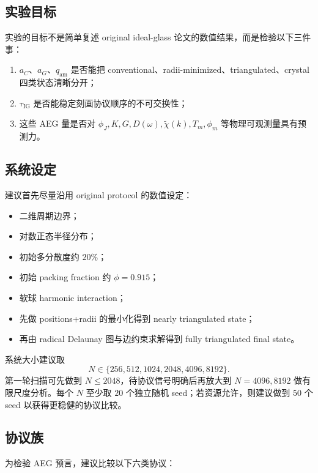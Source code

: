\documentclass[12pt]{ctexart}
\newcommand{\IG}{\mathrm{IG}}
\begin{document}
\subsection{实验目标}

实验的目标不是简单复述 original ideal-glass 论文的数值结果，而是检验以下三件事：
\begin{enumerate}
    \item $a_C$、$a_G$、$q_{\mathrm{am}}$ 是否能把 conventional、radii-minimized、triangulated、crystal 四类状态清晰分开；
    \item $\tau_{\IG}$ 是否能稳定刻画协议顺序的不可交换性；
    \item 这些 AEG 量是否对 $\phi_J, K, G, D(\omega), \tilde\chi(k), T_m, \phi_m$ 等物理可观测量具有预测力。
\end{enumerate}

\subsection{系统设定}

建议首先尽量沿用 original protocol 的数值设定：
\begin{itemize}
    \item 二维周期边界；
    \item 对数正态半径分布；
    \item 初始多分散度约 $20\%$；
    \item 初始 packing fraction 约 $\phi=0.915$；
    \item 软球 harmonic interaction；
    \item 先做 positions+radii 的最小化得到 nearly triangulated state；
    \item 再由 radical Delaunay 图与边约束求解得到 fully triangulated final state。
\end{itemize}

系统大小建议取
\begin{equation}
N\in\{256,512,1024,2048,4096,8192\}.
\end{equation}
第一轮扫描可先做到 $N\le 2048$，待协议信号明确后再放大到 $N=4096,8192$ 做有限尺度分析。每个 $N$ 至少取 $20$ 个独立随机 seed；若资源允许，则建议做到 $50$ 个 seed 以获得更稳健的协议比较。

\subsection{协议族}

为检验 AEG 预言，建议比较以下六类协议：
\end{document}

